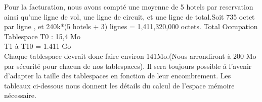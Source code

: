 Pour la facturation, nous avons compt\'e une moyenne de 5 hotels par reservation ainsi qu'une ligne de vol, une ligne de circuit, et une ligne de total.Soit 735 octet par ligne , et 240k*(5 hotels + 3) lignes = 1,411,320,000 octets.
Total Occupation Tablespace T0 : 15,4 Mo\\
T1 à T10 = 1.411 Go\\

Chaque tablespace devrait donc faire environ 141Mo.(Nous arrondiront \`a 200 Mo par s\'ecurit\'e pour chacun de nos tablespaces).
Il sera toujours possible \'a l'avenir d'adapter la taille des tablespaces en fonction de leur encombrement.
Les tableaux ci-dessous nous donnent les d\'etails du calcul de l'espace m\'emoire n\'ecessaire.

\newpage



